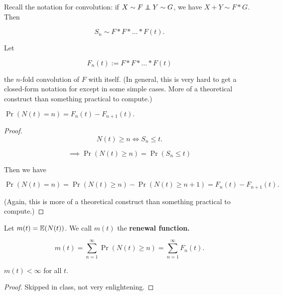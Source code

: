 \begin{definition}Recall the notation for convolution: if \(X \sim F \indep Y \sim G\), we have \(X +Y \sim F * G\). Then

\[
S_n \sim F*F*\ldots *F(t).
\]

Let

\[
F_n(t) := F*F*\ldots *F(t)
\]

the \(n\)-fold convolution of \(F\) with itself. (In general, this is very hard to get a closed-form notation for except in some simple cases. More of a theoretical construct than something practical to compute.)
\end{definition}

\begin{proposition} \(\Pr(N(t) = n) = F_n(t) - F_{n+1}(t).\)

\end{proposition}

\begin{proof}

\[
N(t) \geq n \iff S_n \leq t.
\]

\[
\implies \Pr(N(t) \geq n) = \Pr(S_n \leq t)
\]

Then we have

\[
\Pr(N(t) = n) = \Pr(N(t) \geq n) - \Pr(N(t) \geq n+1) = F_n(t) - F_{n+1}(t).
\]

(Again, this is more of a theoretical construct than something practical to compute.)

\end{proof}

\begin{definition} Let \(m(t) = \E(N(t))\). We call \(m(t)\) the \textbf{renewal function.}

\end{definition}

\begin{remark}

\[
m(t) = \sum_{n=1}^\infty \Pr(N(t) \geq n) = \sum_{n=1}^\infty F_n(t).
\]

\end{remark}

\begin{lemma} \(m(t) < \infty\) for all \(t\).

\end{lemma}

\begin{proof} Skipped in class, not very enlightening.

\end{proof}

